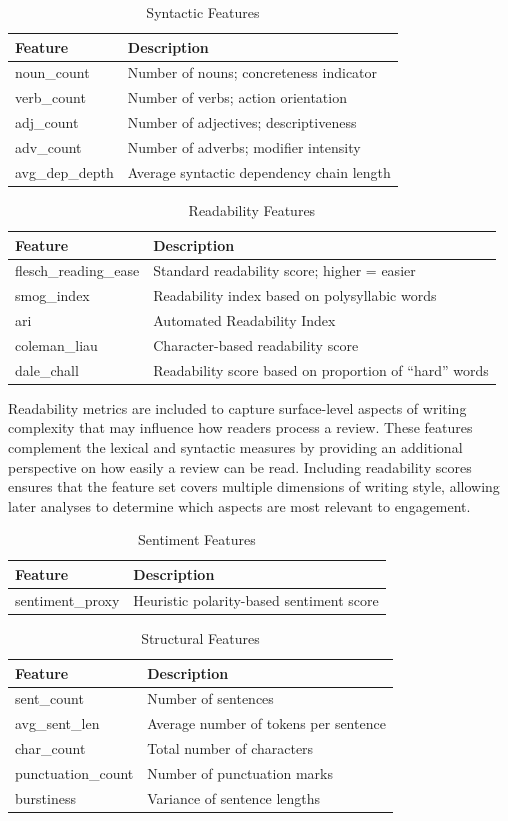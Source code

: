 \documentclass[12pt]{article}
\begin{document}
\begin{longtable}{ll}
\caption{Syntactic Features} \\
\textbf{Feature} & \textbf{Description} \\
\hline
noun\_count & Number of nouns; concreteness indicator \\
verb\_count & Number of verbs; action orientation \\
adj\_count & Number of adjectives; descriptiveness \\
adv\_count & Number of adverbs; modifier intensity \\
avg\_dep\_depth & Average syntactic dependency chain length \\
\end{longtable}

\begin{longtable}{ll}
\caption{Readability Features} \\
\textbf{Feature} & \textbf{Description} \\
\hline
flesch\_reading\_ease & Standard readability score; higher = easier \\
smog\_index & Readability index based on polysyllabic words \\
ari & Automated Readability Index \\
coleman\_liau & Character-based readability score \\
dale\_chall & Readability score based on proportion of “hard” words \\
\end{longtable}

Readability metrics are included to capture surface-level aspects of writing complexity that may influence how readers process a review. These features complement the lexical and syntactic measures by providing an additional perspective on how easily a review can be read. Including readability scores ensures that the feature set covers multiple dimensions of writing style, allowing later analyses to determine which aspects are most relevant to engagement.


\begin{longtable}{ll}
\caption{Sentiment Features} \\
\textbf{Feature} & \textbf{Description} \\
\hline
sentiment\_proxy & Heuristic polarity-based sentiment score \\
\end{longtable}

\begin{longtable}{ll}
\caption{Structural Features} \\
\textbf{Feature} & \textbf{Description} \\
\hline
sent\_count & Number of sentences \\
avg\_sent\_len & Average number of tokens per sentence \\
char\_count & Total number of characters \\
punctuation\_count & Number of punctuation marks \\
burstiness & Variance of sentence lengths \\
\end{longtable}
\end{document}
